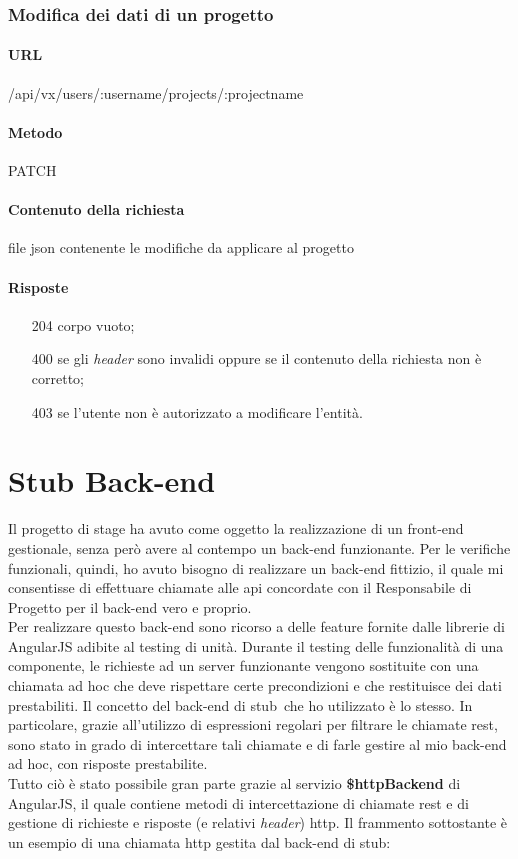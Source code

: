 \subsubsection{Modifica dei dati di un progetto}
\paragraph{URL}
/api/vx/users/:username/projects/:projectname
\paragraph{Metodo}
PATCH
\paragraph{Contenuto della richiesta}
file \gls{json} contenente le modifiche da applicare al progetto
\paragraph{Risposte}
\begin{itemize}
	\item[204] corpo vuoto;
	\item[400] se gli \emph{header} sono invalidi oppure se il contenuto della richiesta non è corretto;
	\item[403] se l'utente non è autorizzato a modificare l'entità.
\end{itemize}



\section{Stub Back-end}
Il progetto di stage ha avuto come oggetto la realizzazione di un \gls{front-end} gestionale, senza però avere al contempo un \gls{back-end} funzionante. Per le verifiche funzionali, quindi, ho avuto bisogno di realizzare un \gls{back-end} fittizio, il quale mi consentisse di effettuare chiamate alle \gls{api} concordate con il Responsabile di Progetto per il \gls{back-end} vero e proprio.\\
Per realizzare questo \gls{back-end} sono ricorso a delle feature fornite dalle librerie di AngularJS adibite al testing di unità. Durante il testing delle funzionalità di una componente, le richieste ad un server funzionante vengono sostituite con una chiamata ad hoc che deve rispettare certe precondizioni e che restituisce dei dati prestabiliti. Il concetto del \gls{back-end} di \gls{stub}\glsfirstoccur\  che ho utilizzato è lo stesso. In particolare, grazie all'utilizzo di espressioni regolari per filtrare le chiamate \gls{rest}, sono stato in grado di intercettare tali chiamate e di farle gestire al mio \gls{back-end} ad hoc, con risposte prestabilite.\\
Tutto ciò è stato possibile gran parte grazie al servizio \textbf{\$httpBackend} di AngularJS, il quale contiene metodi di intercettazione di chiamate \gls{rest} e di gestione di richieste e risposte (e relativi \emph{header}) \gls{http}. Il frammento sottostante è un esempio di una chiamata \gls{http} gestita dal \gls{back-end} di \gls{stub}:

